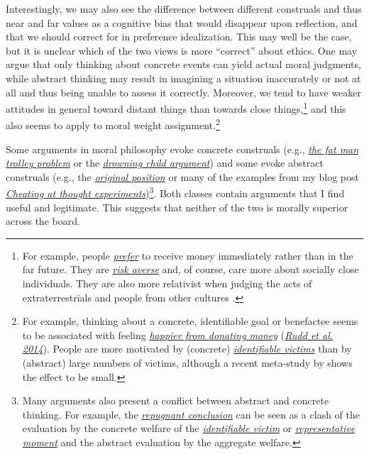 Interestingly, we may also see the difference between different
construals and thus near and far values as a cognitive bias that would
disappear upon reflection, and that we should correct for in preference
idealization. This may well be the case, but it is unclear which of the
two views is more ``correct'' about ethics. One may argue that only
thinking about concrete events can yield actual moral judgments, while
abstract thinking may result in imagining a situation inaccurately or
not at all and thus being unable to assess it correctly. Moreover, we
tend to have weaker attitudes in general toward distant things than
towards close things,\footnote{For example, people
  \href{https://en.wikipedia.org/wiki/Time_preference}{\emph{prefer}} to
  receive money immediately rather than in the far future. They are
  \href{https://en.wikipedia.org/wiki/Risk_aversion}{\emph{risk averse}}
  and, of course, care more about socially close individuals. They are
  also more relativist when judging the acts of extraterrestrials and
  people from other cultures \parencite{Sarkissian2011-be}.}
and this also seems to apply to moral weight assignment.\footnote{For
  example, thinking about a concrete, identifiable goal or benefactee
  seems to be associated with feeling
  \href{https://en.wikipedia.org/wiki/Warm-glow_giving}{\emph{happier
  from donating money}}
  (\href{https://dash.harvard.edu/bitstream/handle/1/12534961/rudd,aaker,norton_getting-the-most-out-of-giving.pdf?sequence=3}{\emph{Rudd
  et al. 2014}}). People are more motivated by (concrete)
  \href{https://en.wikipedia.org/wiki/Identifiable_victim_effect}{\emph{identifiable
  victims}} than by (abstract) large numbers of victims, although a
  recent meta-study by \parencite{Lee2016-lb} shows the
  effect to be small.}

Some arguments in moral philosophy evoke concrete construals (e.g.,
\href{https://en.wikipedia.org/wiki/Trolley_problem\#The_fat_man}{\emph{the
fat man trolley problem}} or the
\href{https://en.wikipedia.org/wiki/Famine,_Affluence,_and_Morality}{\emph{drowning
child argument}}) and some evoke abstract construals (e.g., the
\href{https://en.wikipedia.org/wiki/Original_position}{\emph{original
position}} or many of the examples from my blog post
\href{https://casparoesterheld.com/2015/12/06/cheating-at-thought-experiments/}{\emph{\emph{Cheating
at thought experiments}}})\footnote{Many arguments also present a
  conflict between abstract and concrete thinking. For example, the
  \href{https://en.wikipedia.org/wiki/Mere_addition_paradox}{\emph{repugnant
  conclusion}} can be seen as a clash of the evaluation by the concrete
  welfare of the
  \href{https://en.wikipedia.org/wiki/Identifiable_victim_effect}{\emph{identifiable
  victim}} or
  \href{https://en.wikipedia.org/wiki/Peak\%E2\%80\%93end_rule}{\emph{representative
  moment}} and the abstract evaluation by the aggregate welfare.}. Both
classes contain arguments that I find useful and legitimate. This
suggests that neither of the two is morally superior across the board.

